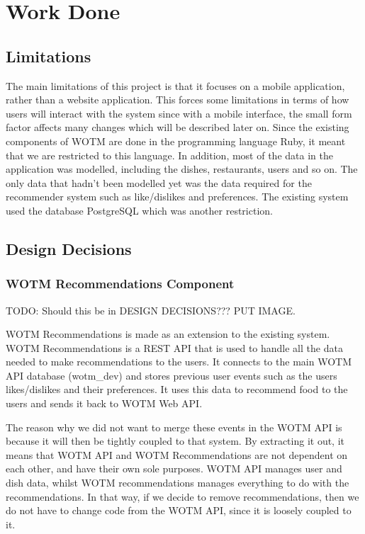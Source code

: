 \chapter{Work Done}\label{C:work_done}

\section{Limitations}

The main limitations of this project is that it focuses on a mobile application, rather than a website application. This forces some limitations in terms of how users will interact with the system since with a mobile interface, the small form factor affects many changes which will be described later on. Since the existing components of WOTM are done in the programming language Ruby, it meant that we are restricted to this language. In addition, most of the data in the application was modelled, including the dishes, restaurants, users and so on. The only data that hadn't been modelled yet was the data required for the recommender system such as like/dislikes and preferences. The existing system used the database PostgreSQL which was another restriction.  

\section{Design Decisions}

\subsection{WOTM Recommendations Component}
TODO: Should this be in DESIGN DECISIONS???
PUT IMAGE.

WOTM Recommendations is made as an extension to the existing system. WOTM Recommendations is a REST API that is used to handle all the data needed to make recommendations to the users. It connects to the main WOTM API database (wotm\_dev) and stores previous user events such as the users likes/dislikes and their preferences. It uses this data to recommend food to the users and sends it back to WOTM Web API. 

The reason why we did not want to merge these events in the WOTM API is because it will then be tightly coupled to that system. By extracting it out, it means that WOTM API and WOTM Recommendations are not dependent on each other, and have their own sole purposes. WOTM API manages user and dish data, whilst WOTM recommendations manages everything to do with the recommendations. In that way, if we decide to remove recommendations, then we do not have to change code from the WOTM API, since it is loosely coupled to it. 

